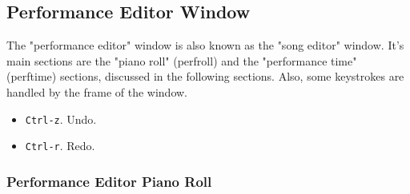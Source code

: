 \subsection{Performance Editor Window}
\label{subsec:kbd_mouse_performance_editor_window}

   The "performance editor" window is also known as the "song editor" window.
   It's main sections are the "piano roll" (perfroll) and the "performance
   time" (perftime) sections, discussed in the following sections.
   Also, some keystrokes are handled by the frame of the window.

   \begin{itemize}
      \item \texttt{Ctrl-z}. Undo.
      \item \texttt{Ctrl-r}. Redo.
   \end{itemize}

\subsubsection{Performance Editor Piano Roll}
\label{subsubsec:kbd_mouse_performance_editor_piano_roll}

